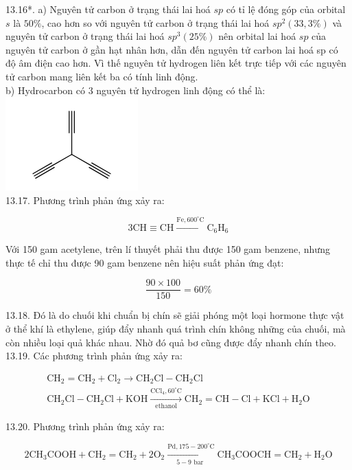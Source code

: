 \documentclass[10pt]{article}
\begin{document}
13.16*. a) Nguyên tử carbon ở trạng thái lai hoá $s p$ có tỉ lệ đóng góp của orbital $s$ là $50 \%$, cao hơn so với nguyên tử carbon ở trạng thái lai hoá $s p^{2}(33,3 \%)$ và nguyên tử carbon ở trạng thái lai hoá $s p^{3}(25 \%)$ nên orbital lai hoá $s p$ của nguyên tử carbon ở gần hạt nhân hơn, dẫn đến nguyên tử carbon lai hoá sp có độ âm điện cao hơn. Vì thế nguyên tử hydrogen liên kết trực tiếp với các nguyên tử carbon mang liên kết ba có tính linh động.\\
b) Hydrocarbon có 3 nguyên tử hydrogen linh động có thể là:\\
\includegraphics{smile-4a5dfae778cec4836c446f56cb00f910e1da4e22}\\
13.17. Phương trình phản ứng xảy ra:

$$
3 \mathrm{CH} \equiv \mathrm{CH} \xrightarrow{\mathrm{Fe}, 600^{\circ} \mathrm{C}} \mathrm{C}_{6} \mathrm{H}_{6}
$$

Với 150 gam acetylene, trên lí thuyết phải thu được 150 gam benzene, nhưng thực tế chỉ thu được 90 gam benzene nên hiệu suất phản ứng đạt:

$$
\frac{90 \times 100}{150}=60 \%
$$

13.18. Đó là do chuối khi chuẩn bị chín sẽ giải phóng một loại hormone thực vật ở thể khí là ethylene, giúp đẩy nhanh quá trình chín không những của chuối, mà còn nhiều loại quả khác nhau. Nhờ đó quả bơ cũng được đẩy nhanh chín theo.\\
13.19. Các phương trình phản ứng xảy ra:

$$
\begin{gathered}
\mathrm{CH}_{2}=\mathrm{CH}_{2}+\mathrm{Cl}_{2} \longrightarrow \mathrm{CH}_{2} \mathrm{Cl}-\mathrm{CH}_{2} \mathrm{Cl} \\
\mathrm{CH}_{2} \mathrm{Cl}-\mathrm{CH}_{2} \mathrm{Cl}+\mathrm{KOH} \xrightarrow[\text { ethanol }]{\mathrm{CCl}_{4}, 60^{\circ} \mathrm{C}} \mathrm{CH}_{2}=\mathrm{CH}-\mathrm{Cl}+\mathrm{KCl}+\mathrm{H}_{2} \mathrm{O}
\end{gathered}
$$

13.20. Phương trình phản ứng xảy ra:

$$
2 \mathrm{CH}_{3} \mathrm{COOH}+\mathrm{CH}_{2}=\mathrm{CH}_{2}+2 \mathrm{O}_{2} \xrightarrow[5-9 \text { bar }]{\mathrm{Pd}, 175-200^{\circ} \mathrm{C}} \mathrm{CH}_{3} \mathrm{COOCH}=\mathrm{CH}_{2}+\mathrm{H}_{2} \mathrm{O}
$$
\end{document}
